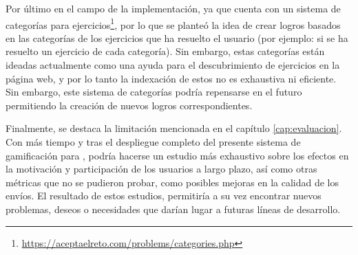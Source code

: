 Por último en el campo de la implementación, ya que \aer cuenta con un sistema de categorías para ejercicios\footnote{\url{https://aceptaelreto.com/problems/categories.php}}, por lo que se planteó la idea de crear logros basados en las categorías de los ejercicios que ha resuelto el usuario (por ejemplo: si se ha resuelto un ejercicio de cada categoría). Sin embargo, estas categorías están ideadas actualmente como una ayuda para el descubrimiento de ejercicios en la página web, y por lo tanto la indexación de estos no es exhaustiva ni eficiente. Sin embargo, este sistema de categorías podría repensarse en el futuro permitiendo la creación de nuevos logros correspondientes.

Finalmente, se destaca la limitación mencionada en el capítulo \ref{cap:evaluacion}. Con más tiempo y tras el despliegue completo del presente sistema de gamificación para \aer, podría hacerse un estudio más exhaustivo sobre los efectos en la motivación y participación de los usuarios a largo plazo, así como otras métricas que no se pudieron probar, como posibles mejoras en la calidad de los envíos. El resultado de estos estudios, permitiría a su vez encontrar nuevos problemas, deseos o necesidades que darían lugar a futuras líneas de desarrollo.